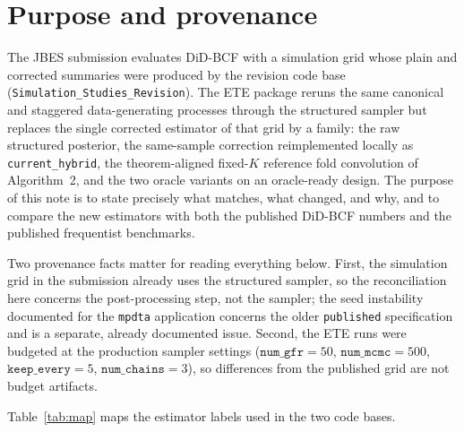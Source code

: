 \documentclass[11pt]{article}
\begin{document}
\section{Purpose and provenance}
\label{sec:purpose}

The JBES submission evaluates DiD-BCF with a simulation grid whose plain and corrected
summaries were produced by the revision code base
(\texttt{Simulation\_Studies\_Revision}). The ETE package reruns the same canonical and
staggered data-generating processes through the structured sampler but replaces the
single corrected estimator of that grid by a family: the raw structured posterior, the
same-sample correction reimplemented locally as \texttt{current\_hybrid}, the theorem-aligned
fixed-$K$ reference fold convolution of Algorithm~2, and the two oracle variants on an
oracle-ready design. The purpose of this note is to state precisely what matches, what
changed, and why, and to compare the new estimators with both the published DiD-BCF
numbers and the published frequentist benchmarks.

Two provenance facts matter for reading everything below. First, the simulation grid in
the submission already uses the structured sampler, so the reconciliation here concerns
the post-processing step, not the sampler; the seed instability documented for the
\texttt{mpdta} application concerns the older \texttt{published} specification and is a
separate, already documented issue. Second, the ETE runs were budgeted at the production
sampler settings ($\texttt{num\_gfr}=50$, $\texttt{num\_mcmc}=500$,
$\texttt{keep\_every}=5$, $\texttt{num\_chains}=3$), so differences from the published
grid are not budget artifacts.

Table~\ref{tab:map} maps the estimator labels used in the two code bases.
\end{document}

